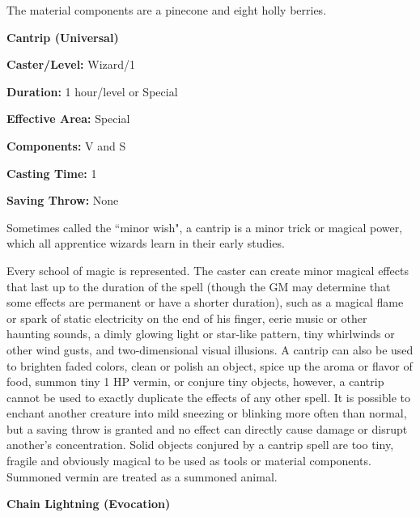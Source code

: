 \begin{multicols}{2}
The material components are a pinecone and eight holly berries.

\vspace{1em}

\noindent
\begin{minipage}{\columnwidth}

\noindent \textbf{Cantrip (Universal)}

\noindent \textbf{Caster/Level:} Wizard/1

\noindent \textbf{Duration:} 1 hour/level or Special

\noindent \textbf{Effective Area:} Special

\noindent \textbf{Components:} V and S

\noindent \textbf{Casting Time:} 1

\noindent \textbf{Saving Throw:} None

\end{minipage}

Sometimes called the ``minor wish", a cantrip is a minor trick or magical power, which all apprentice wizards learn in their early studies.  

Every school of magic is represented.  The caster can create minor magical effects that last up to the duration of the spell (though the GM may determine that some effects are permanent or have a shorter duration), such as a magical flame or spark of static electricity on the end of his finger, eerie music or other haunting sounds, a dimly glowing light or star-like pattern, tiny whirlwinds or other wind gusts, and two-dimensional visual illusions.  A cantrip can also be used to brighten faded colors, clean or polish an object, spice up the aroma or flavor of food, summon tiny 1 HP vermin, or conjure tiny objects, however, a cantrip cannot be used to exactly duplicate the effects of any other spell.  It is possible to enchant another creature into mild sneezing or blinking more often than normal, but a saving throw is granted and no effect can directly cause damage or disrupt another's concentration.  Solid objects conjured by a cantrip spell are too tiny, fragile and obviously magical to be used as tools or material components.  Summoned vermin are treated as a summoned animal.

\vspace{1em}

\noindent
\begin{minipage}{\columnwidth}

\noindent \textbf{Chain Lightning (Evocation)}


\end{minipage}
\end{multicols}
